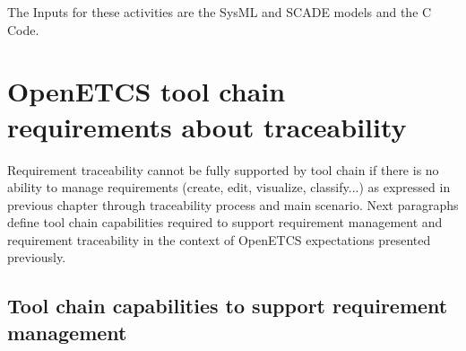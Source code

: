 \documentclass[11pt]{template/openetcs_report}
\begin{document}
The Inputs for these activities are the SysML and SCADE models and the C Code.



\chapter{OpenETCS tool chain requirements about traceability}
\label{sec-4} 
Requirement traceability cannot be fully supported by tool chain if there is no ability to manage requirements (create, edit, visualize, classify...) as expressed in previous chapter through traceability process and main scenario.
Next paragraphs define tool chain capabilities required to support requirement management and requirement traceability in the context of OpenETCS expectations presented previously.

\section{Tool chain capabilities to support requirement management}
\end{document}
